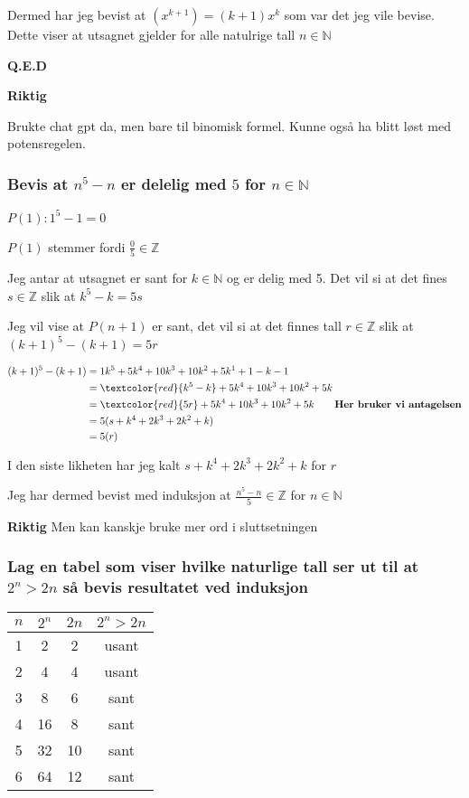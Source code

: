 \documentclass{article}
\begin{document}
Dermed har jeg bevist at $(x^{k+1})=(k+1)x^k$ som var det jeg vile bevise. Dette viser at utsagnet gjelder for alle natulrige tall $n \in \mathbb{N}$

\textbf{Q.E.D}

\textbf{Riktig}

Brukte chat gpt da, men bare til binomisk formel. Kunne også ha blitt løst med potensregelen.

\newpage

\subsubsection{Bevis at $n^5-n$ er delelig med $5$ for $n \in \mathbb{N}$}

$P(1): 1^5-1=0$

$P(1)$ stemmer fordi $\frac{0}{5}\in \mathbb{Z}$

Jeg antar at utsagnet er sant for $k \in \mathbb{N}$ og er delig med 5. Det vil si at det fines $s \in \mathbb{Z}$ slik at $k^5-k=5s$

Jeg vil vise at $P(n+1)$ er sant, det vil si at det finnes tall $r \in \mathbb{Z}$ slik at $(k+1)^5-(k+1)=5r$

\begin{align*}
    (k+1)^5-(k+1) &= 1k^5+5k^4+10k^3+10k^2+5k^1+1-k-1 \\
    &= \textcolor{red}{k^5-k}+5k^4+10k^3+10k^2+5k \\
    &= \textcolor{red}{5r}+5k^4+10k^3+10k^2+5k \qquad \textbf{Her bruker vi antagelsen}\\
    &= 5(s+k^4+2k^3+2k^2+k) \\
    &= 5(r)
\end{align*}

I den siste likheten har jeg kalt $s+k^4+2k^3+2k^2+k$ for $r$

Jeg har dermed bevist med induksjon at $\frac{n^5-n}{5} \in \mathbb{Z}$ for $n \in \mathbb{N}$

\textbf{Riktig}
Men kan kanskje bruke mer ord i sluttsetningen

\subsubsection{Lag en tabel som viser hvilke naturlige tall ser ut til at $2^n > 2n$ så bevis resultatet ved induksjon}

\begin{tabular}{|c|c|c|c|}
    \hline
    $n$ & $2^n$ & $2n$ & $2^n > 2n$ \\
    \hline
    1 & 2 & 2 & usant \\
    2 & 4 & 4 & usant \\
    3 & 8 & 6 & sant \\
    4 & 16 & 8 & sant \\
    5 & 32 & 10 & sant \\
    6 & 64 & 12 & sant \\
    \hline
\end{tabular}
\end{document}
